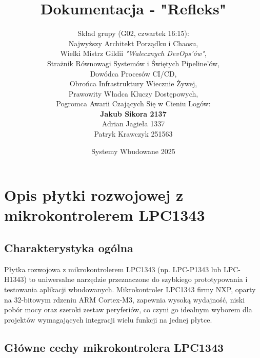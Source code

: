 \documentclass[a4paper,12pt]{report}
\title{Dokumentacja - "Refleks"}
\date{Systemy Wbudowane 2025}
\author{Skład grupy (G02, czwartek 16:15):\\
Najwyższy Architekt Porządku i Chaosu, \\Wielki Mistrz Gildii \textit{"Walecznych DevOps'ów"}, \\Strażnik Równowagi Systemów i Świętych Pipeline’ów, \\Dowódca Procesów CI/CD, \\Obrońca Infrastruktury Wiecznie Żywej, \\Prawowity Władca Kluczy Dostępowych, \\Pogromca Awarii Czających Się w Cieniu Logów: \\ {\huge \textbf{ Jakub Sikora 2137}} \\
Adrian Jagieła 1337\\
Patryk Krawczyk 251563}
\begin{document}
\maketitle

\tableofcontents

\chapter{Opis płytki rozwojowej z mikrokontrolerem LPC1343}

\section{Charakterystyka ogólna}

Płytka rozwojowa z mikrokontrolerem LPC1343 (np. LPC-P1343 lub LPC-H1343) to uniwersalne narzędzie przeznaczone do szybkiego prototypowania i testowania aplikacji wbudowanych. Mikrokontroler LPC1343 firmy NXP, oparty na 32-bitowym rdzeniu ARM Cortex-M3, zapewnia wysoką wydajność, niski pobór mocy oraz szeroki zestaw peryferiów, co czyni go idealnym wyborem dla projektów wymagających integracji wielu funkcji na jednej płytce.

\section{Główne cechy mikrokontrolera LPC1343}
\end{document}
